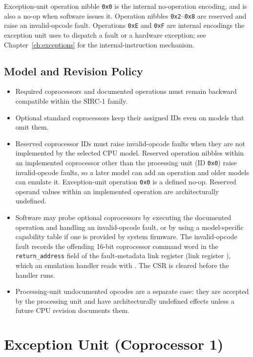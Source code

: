 \noindent Exception-unit operation nibble \texttt{0x0} is the internal no-operation encoding, and is also a no-op when
software issues it. Operation nibbles \texttt{0x2}--\texttt{0x8} are reserved and raise an invalid-opcode fault.
Operations \texttt{0xE} and \texttt{0xF} are internal encodings the exception unit uses to dispatch a fault or
a hardware exception; see Chapter~\ref{ch:exceptions} for the internal-instruction mechanism.

\subsection{Model and Revision Policy}
\label{sec:coprocessor-model-revision-policy}

\begin{itemize}
	\item Required coprocessors and documented operations must remain backward compatible within the SIRC-1 family.
	\item Optional standard coprocessors keep their assigned IDs even on models that omit them.
	\item Reserved coprocessor IDs must raise invalid-opcode faults when they are not implemented by the selected CPU model.
	      Reserved operation nibbles within an implemented coprocessor other than the processing unit (ID \texttt{0x0}) raise
	      invalid-opcode faults, so a later model can add an operation and older models can emulate it. Exception-unit operation
	      \texttt{0x0} is a defined no-op. Reserved operand values within an implemented operation are architecturally undefined.
	\item Software may probe optional coprocessors by executing the documented operation and handling an invalid-opcode fault, or
	      by using a model-specific capability table if one is provided by system firmware. The invalid-opcode fault records the
	      offending 16-bit coprocessor command word in the \texttt{return\_address} field of the fault-metadata link register
	      (link register ), which an emulation handler reads with . The CSR is cleared before the handler
	      runs.
	\item Processing-unit undocumented opcodes are a separate case: they are accepted by the processing unit and have
	      architecturally undefined effects unless a future CPU revision documents them.
\end{itemize}

\section{Exception Unit (Coprocessor 1)}

